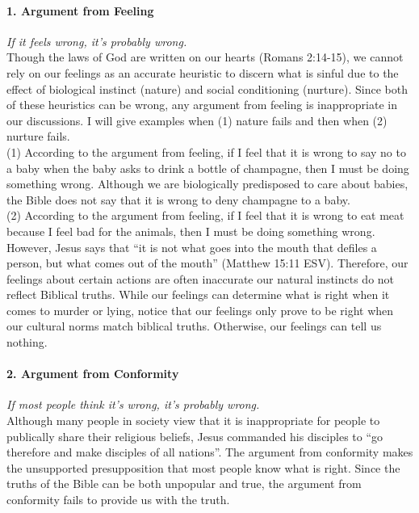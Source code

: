 \documentclass[a4paper, 12pt]{article}
\begin{document}
\paragraph{1. Argument from Feeling} \textit{If it feels wrong, it's probably wrong.} \\
Though the laws of God are written on our hearts (Romans 2:14-15), we cannot rely on our feelings as an accurate heuristic to discern what is sinful due to the effect of biological instinct (nature) and social conditioning (nurture). Since both of these heuristics can be wrong, any argument from feeling is inappropriate in our discussions. I will give examples when (1) nature fails and then when (2) nurture fails. \\
\break
(1) According to the argument from feeling, if I feel that it is wrong to say no to a baby when the baby asks to drink a bottle of champagne, then I must be doing something wrong. Although we are biologically predisposed to care about babies, the Bible does not say that it is wrong to deny champagne to a baby. \\
\break
(2) According to the argument from feeling, if I feel that it is wrong to eat meat because I feel bad for the animals, then I must be doing something wrong. However, Jesus says that ``it is not what goes into the mouth that defiles a person, but what comes out of the mouth'' (Matthew 15:11 ESV). Therefore, our feelings about certain actions are often inaccurate our natural instincts do not reflect Biblical truths. While our feelings can determine what is right when it comes to murder or lying, notice that our feelings only prove to be right when our cultural norms match biblical truths. Otherwise, our feelings can tell us nothing. \\
\paragraph{2. Argument from Conformity} \textit{If most people think it's wrong, it's probably wrong.} \\
Although many people in society view that it is inappropriate for people to publically share their religious beliefs, Jesus commanded his disciples to ``go therefore and make disciples of all nations''. The argument from conformity makes the unsupported presupposition that most people know what is right. Since the truths of the Bible can be both unpopular and true, the argument from conformity fails to provide us with the truth. \\
\pagebreak
\end{document}
